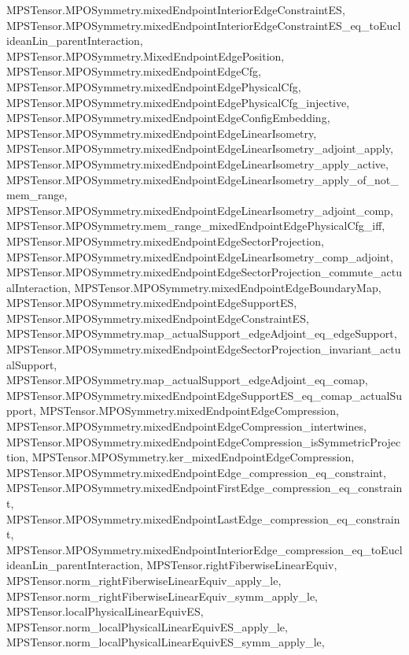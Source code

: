 \begin{lemma}
{        MPSTensor.MPOSymmetry.mixedEndpointInteriorEdgeConstraintES,
        MPSTensor.MPOSymmetry.mixedEndpointInteriorEdgeConstraintES_eq_toEuclideanLin_parentInteraction,
        MPSTensor.MPOSymmetry.MixedEndpointEdgePosition,
        MPSTensor.MPOSymmetry.mixedEndpointEdgeCfg,
        MPSTensor.MPOSymmetry.mixedEndpointEdgePhysicalCfg,
        MPSTensor.MPOSymmetry.mixedEndpointEdgePhysicalCfg_injective,
        MPSTensor.MPOSymmetry.mixedEndpointEdgeConfigEmbedding,
        MPSTensor.MPOSymmetry.mixedEndpointEdgeLinearIsometry,
        MPSTensor.MPOSymmetry.mixedEndpointEdgeLinearIsometry_adjoint_apply,
        MPSTensor.MPOSymmetry.mixedEndpointEdgeLinearIsometry_apply_active,
        MPSTensor.MPOSymmetry.mixedEndpointEdgeLinearIsometry_apply_of_not_mem_range,
        MPSTensor.MPOSymmetry.mixedEndpointEdgeLinearIsometry_adjoint_comp,
        MPSTensor.MPOSymmetry.mem_range_mixedEndpointEdgePhysicalCfg_iff,
        MPSTensor.MPOSymmetry.mixedEndpointEdgeSectorProjection,
        MPSTensor.MPOSymmetry.mixedEndpointEdgeLinearIsometry_comp_adjoint,
        MPSTensor.MPOSymmetry.mixedEndpointEdgeSectorProjection_commute_actualInteraction,
        MPSTensor.MPOSymmetry.mixedEndpointEdgeBoundaryMap,
        MPSTensor.MPOSymmetry.mixedEndpointEdgeSupportES,
        MPSTensor.MPOSymmetry.mixedEndpointEdgeConstraintES,
        MPSTensor.MPOSymmetry.map_actualSupport_edgeAdjoint_eq_edgeSupport,
        MPSTensor.MPOSymmetry.mixedEndpointEdgeSectorProjection_invariant_actualSupport,
        MPSTensor.MPOSymmetry.map_actualSupport_edgeAdjoint_eq_comap,
        MPSTensor.MPOSymmetry.mixedEndpointEdgeSupportES_eq_comap_actualSupport,
        MPSTensor.MPOSymmetry.mixedEndpointEdgeCompression,
        MPSTensor.MPOSymmetry.mixedEndpointEdgeCompression_intertwines,
        MPSTensor.MPOSymmetry.mixedEndpointEdgeCompression_isSymmetricProjection,
        MPSTensor.MPOSymmetry.ker_mixedEndpointEdgeCompression,
        MPSTensor.MPOSymmetry.mixedEndpointEdge_compression_eq_constraint,
        MPSTensor.MPOSymmetry.mixedEndpointFirstEdge_compression_eq_constraint,
        MPSTensor.MPOSymmetry.mixedEndpointLastEdge_compression_eq_constraint,
        MPSTensor.MPOSymmetry.mixedEndpointInteriorEdge_compression_eq_toEuclideanLin_parentInteraction,
        MPSTensor.rightFiberwiseLinearEquiv,
        MPSTensor.norm_rightFiberwiseLinearEquiv_apply_le,
        MPSTensor.norm_rightFiberwiseLinearEquiv_symm_apply_le,
        MPSTensor.localPhysicalLinearEquivES,
        MPSTensor.norm_localPhysicalLinearEquivES_apply_le,
        MPSTensor.norm_localPhysicalLinearEquivES_symm_apply_le,
}
\end{lemma}
